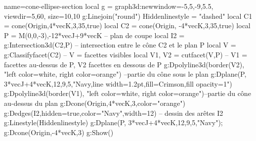 \documentclass[varwidth, border = 3pt]{standalone}
\begin{document}
\begin{luadraw}{name=cone-ellipse-section}
local g = graph3d:new{window={-5,5,-9,5.5}, viewdir={5,60}, size={10,10}}
g:Linejoin("round")
Hiddenlinestyle = "dashed"
local C1 = cone(Origin,4*vecK,3,35,true)
local C2 = cone(Origin, -4*vecK,3,35,true)
local P = {M(0,0,-3),-12*vecJ+9*vecK} -- plan de coupe
local I2 = g:Intersection3d(C2,P) -- intersection entre le cône C2 et le plan P
local V = g:Classifyfacet(C2) -- V = facettes visibles
local V1, V2 = cutfacet(V,P) -- V1 = facettes au-dessus de P, V2 facettes en dessous de P
g:Dpolyline3d(border(V2), "left color=white, right color=orange") --partie du cône sous le plan
g:Dplane(P, 3*vecJ+4*vecK,12,9,5,"Navy,line width=1.2pt,fill=Crimson,fill opacity=1")
g:Dpolyline3d(border(V1), "left color=white, right color=orange")--partie du cône au-dessus du plan
g:Dcone(Origin,4*vecK,3,{color="orange"})
g:Dedges(I2,{hidden=true,color="Navy",width=12}) -- dessin des arêtes I2
g:Linestyle(Hiddenlinestyle)
g:Dplane(P, 3*vecJ+4*vecK,12,9,5,"Navy"); g:Dcone(Origin,-4*vecK,3)
g:Show()
\end{luadraw}
\end{document}
